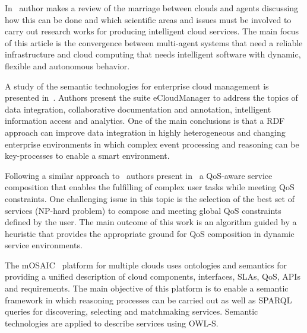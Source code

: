 

In~\cite{DBLP:conf/woa/Talia11} author makes a review of the marriage between clouds and agents 
discussing how this can be done and which scientific areas and issues must be 
involved to carry out research works for producing intelligent cloud services. 
The main focus of this article is the convergence between multi-agent systems 
that need a reliable infrastructure and cloud computing that needs intelligent 
software with dynamic, flexible and autonomous behavior. 


A study of the semantic technologies for enterprise cloud management is presented in~\cite{Haase:2010:STE:1940334.1940342}. 
Authors present the suite eCloudManager to address the topics of data integration, collaborative documentation and annotation, 
intelligent information access and analytics. One of the main conclusions is that a RDF approach can improve data integration 
in highly heterogeneous and changing enterprise environments in which complex event processing and reasoning can be key-processes to 
enable a smart environment.


Following a similar approach to~\cite{Mabrouk:2009:SEQ:1564601.1564724} authors 
present in~\cite{Mabrouk:2009:QSC:1656980.1656990} a QoS-aware service 
composition that enables the fulfilling of complex user tasks while meeting QoS 
constraints. One challenging issue in this topic is the selection of the best 
set of services (NP-hard problem) to compose and meeting global QoS constraints defined by the 
user. The main outcome of this work is an algorithm guided by a heuristic that provides 
the appropriate ground for QoS composition in dynamic service environments. 

The mOSAIC~\cite{Cretella:2012:UMS:2428736.2428805} platform for multiple clouds uses ontologies and 
semantics for providing a unified description of cloud components, interfaces, SLAs, QoS, APIs and requirements. 
The main objective of this platform is to enable a semantic framework in which reasoning processes can be carried out as well as 
SPARQL queries for discovering, selecting and matchmaking services. Semantic technologies are applied to describe services using OWL-S. 

